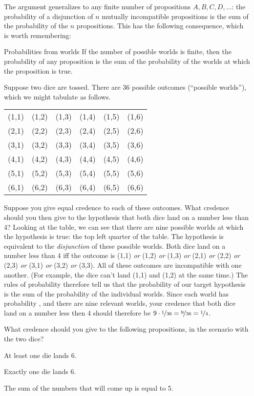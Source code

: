 The argument generalizes to any finite number of propositions
$A,B,C,D,\ldots$: the probability of a disjunction of $n$ mutually
incompatible propositions is the sum of the probability of the $n$
propositions. This has the following consequence, which is worth
remembering:

\begin{genericthm}{Probabilities from worlds}
  If the number of possible worlds is finite, then the probability of
  any proposition is the sum of the probability of the worlds at which
  the proposition is true.
\end{genericthm}

Suppose two dice are tossed. There are 36 possible
outcomes (``possible worlds''), which we might tabulate as follows.
%
\begin{center}
\begin{tabular}{cccccc}
  (1,1) & (1,2) & (1,3) & (1,4) & (1,5) & (1,6)\\
  (2,1) & (2,2) & (2,3) & (2,4) & (2,5) & (2,6)\\
  (3,1) & (3,2) & (3,3) & (3,4) & (3,5) & (3,6)\\
  (4,1) & (4,2) & (4,3) & (4,4) & (4,5) & (4,6)\\
  (5,1) & (5,2) & (5,3) & (5,4) & (5,5) & (5,6)\\
  (6,1) & (6,2) & (6,3) & (6,4) & (6,5) & (6,6)
\end{tabular}
\end{center}
%
Suppose you give equal credence  to each of these
outcomes. What credence should you then give to the hypothesis that
both dice land on a number less than 4? Looking at the table, we can
see that there are nine possible worlds at which the hypothesis is
true: the top left quarter of the table. The hypothesis is equivalent
to the \emph{disjunction} of these possible worlds. Both dice land on a
number less than 4 iff the outcome is (1,1) \emph{or} (1,2) \emph{or}
(1,3) \emph{or} (2,1) \emph{or} (2,2) \emph{or} (2,3) \emph{or} (3,1)
\emph{or} (3,2) \emph{or} (3,3). All of these outcomes are
incompatible with one another. (For example, the dice can't land (1,1)
and (1,2) at the same time.) The rules of probability therefore tell us
that the probability of our target hypothesis is the sum of the
probability of the individual worlds. Since each world has probability
, and there are nine relevant worlds, your credence
that both dice land on a number less then 4 should therefore be
$9 \cdot \nicefrac{1}{36} = \nicefrac{9}{36} = \nicefrac{1}{4}$.
\begin{exercise1}
  What credence should you give to the following propositions, in the
  scenario with the two dice?
  \begin{exlist}
  \item At least one die lands 6.
  \item Exactly one die lands 6.
  \item The sum of the numbers that will come up is equal to 5.
  \end{exlist}
\end{exercise1}

